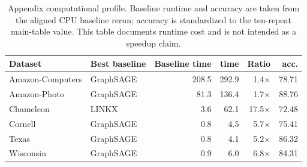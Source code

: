 \begin{table}[t]
\centering
\small
\caption{
Appendix computational profile. Baseline runtime and accuracy are taken from
the aligned CPU baseline rerun; \SRC{} accuracy is standardized to the
ten-repeat main-table value. This table documents runtime cost and is not
intended as a speedup claim.
}
\label{tab:efficiency}
\begin{tabular}{llrrrr}
\toprule
Dataset & Best baseline & Baseline time & \SRC{} time & Ratio & \SRC{} acc. \\
\midrule
Amazon-Computers & GraphSAGE & 208.5 & 292.9 & 1.4$\times$ & 78.71 \\
Amazon-Photo & GraphSAGE & 81.3 & 136.4 & 1.7$\times$ & 88.76 \\
Chameleon & LINKX & 3.6 & 62.1 & 17.5$\times$ & 72.48 \\
Cornell & GraphSAGE & 0.8 & 4.5 & 5.7$\times$ & 75.41 \\
Texas & GraphSAGE & 0.8 & 4.1 & 5.2$\times$ & 86.32 \\
Wisconsin & GraphSAGE & 0.9 & 6.0 & 6.8$\times$ & 84.31 \\
\bottomrule
\end{tabular}
\end{table}
